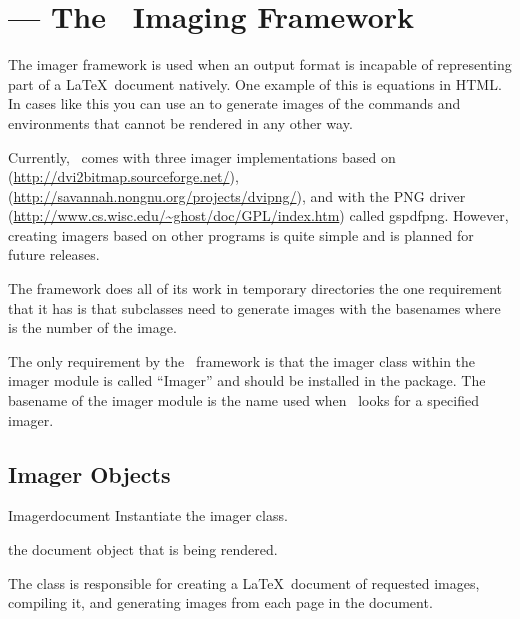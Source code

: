 
\section{ --- The \plasTeX\ Imaging Framework\label{sec:imager-api}}


The imager framework is used when an output format is incapable of 
representing part of a \LaTeX\ document natively.  One example of this
is equations in HTML.  In cases like this you can use an 
 to generate images of the commands and environments
that cannot be rendered in any other way.

Currently, \plasTeX\ comes with three imager implementations based
on  (\url{http://dvi2bitmap.sourceforge.net/}),
 (\url{http://savannah.nongnu.org/projects/dvipng/}),
and  with the PNG driver 
(\url{http://www.cs.wisc.edu/~ghost/doc/GPL/index.htm}) called gspdfpng.
However, creating imagers based on other programs is quite simple
and is planned for future releases.

The  framework does all of its work in temporary directories
the one requirement that it has is that  subclasses need
to generate images with the basenames  where  is
the number of the image.

The only requirement by the \plasTeX\ framework is that the imager class
within the imager module is called ``Imager'' and should be installed in
the  package.  The basename of the imager
module is the name used when \plasTeX\ looks for a specified imager.


\subsection{Imager Objects}

\begin{classdesc}{Imager}{document}
Instantiate the imager class.

 the document object that is being rendered.

The  class is responsible for creating a \LaTeX\ document
of requested images, compiling it, and generating images from each
page in the document.
\end{classdesc}

